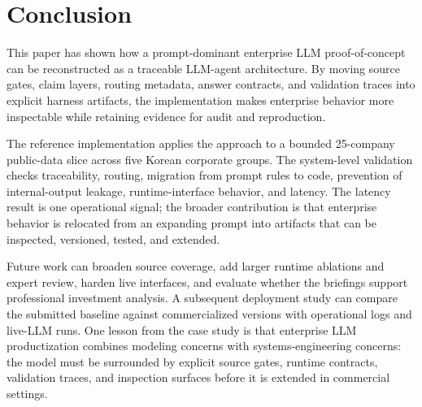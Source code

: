 \section{Conclusion}

This paper has shown how a prompt-dominant enterprise LLM proof-of-concept can be reconstructed as a traceable LLM-agent architecture. By moving source gates, claim layers, routing metadata, answer contracts, and validation traces into explicit harness artifacts, the implementation makes enterprise behavior more inspectable while retaining evidence for audit and reproduction.

The reference implementation applies the approach to a bounded 25-company public-data slice across five Korean corporate groups. The system-level validation checks traceability, routing, migration from prompt rules to code, prevention of internal-output leakage, runtime-interface behavior, and latency. The latency result is one operational signal; the broader contribution is that enterprise behavior is relocated from an expanding prompt into artifacts that can be inspected, versioned, tested, and extended.

Future work can broaden source coverage, add larger runtime ablations and expert review, harden live interfaces, and evaluate whether the briefings support professional investment analysis. A subsequent deployment study can compare the submitted baseline against commercialized versions with operational logs and live-LLM runs. One lesson from the case study is that enterprise LLM productization combines modeling concerns with systems-engineering concerns: the model must be surrounded by explicit source gates, runtime contracts, validation traces, and inspection surfaces before it is extended in commercial settings.
